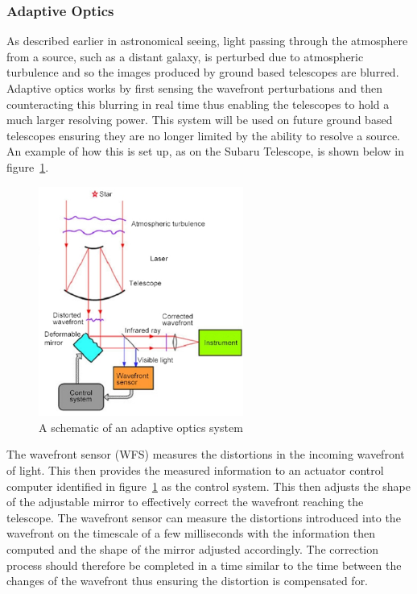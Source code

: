 		\subsubsection{Adaptive Optics} %
		\label{ssub:adaptive_optics}
			As described earlier in astronomical seeing, light passing through the atmosphere from a source, such as a distant galaxy, is perturbed due to atmospheric turbulence and so the images produced by ground based telescopes are blurred. Adaptive optics works by first sensing the wavefront perturbations and then counteracting this blurring in real time thus enabling the telescopes to hold a much larger resolving power. This system will be used on future ground based telescopes ensuring they are no longer limited by the ability to resolve a source. An example of how this is set up, as on the Subaru Telescope, is shown below in figure~\ref{fig:AdaptiveOptics}.
			\begin{figure}[!htb]
				\centering
				\includegraphics[width=0.6\textwidth]{../Images/AdaptiveOptics.png}
				\caption{A schematic of an adaptive optics system\cite{Adaptive}}\label{fig:AdaptiveOptics}
			\end{figure}

			The wavefront sensor (WFS) measures the distortions in the incoming wavefront of light. This then provides the measured information to an actuator control computer identified in figure~\ref{fig:AdaptiveOptics} as the control system. This then adjusts the shape of the adjustable mirror to effectively correct the wavefront reaching the telescope\cite{Diffraction_Limited_Imaging_Saha}.  The wavefront sensor can measure the distortions introduced into the wavefront on the timescale of a few milliseconds with the information then computed and the shape of the mirror adjusted accordingly. The correction process should therefore be completed in a time similar to the time between the changes of the wavefront thus ensuring the distortion is compensated for.


